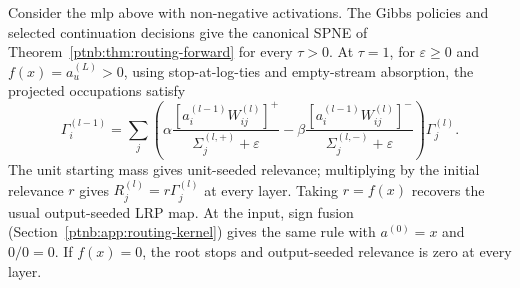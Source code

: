 \begin{theoremenv}\label{ptnb:thm:ab-recovery}\label{ptnb:thm:lrp-recovery}\label{thm:lrp_recovery}
Consider the \ac{mlp} above with non-negative activations. The Gibbs policies and selected continuation decisions give the canonical SPNE of Theorem~\ref{ptnb:thm:routing-forward} for every $\tau>0$. At $\tau=1$, for $\varepsilon\geq0$ and $f(x)=a_u^{(L)}>0$, using stop-at-log-ties and empty-stream absorption, the projected occupations satisfy
 \begin{equation}\label{ptnb:eq:lrp-eps-recovery}
 \Gamma_i^{(l-1)}=\sum_j\left(
 \alpha\frac{[a_i^{(l-1)}W_{ij}^{(l)}]^+}{\Sigma_j^{(l,+)}+\varepsilon}
 -\beta\frac{[a_i^{(l-1)}W_{ij}^{(l)}]^-}{\Sigma_j^{(l,-)}+\varepsilon}
 \right)\Gamma_j^{(l)}.
 \end{equation}
 The unit starting mass gives unit-seeded relevance; multiplying by the initial relevance $r$ gives $R_j^{(l)}=r\Gamma_j^{(l)}$ at every layer. Taking $r=f(x)$ recovers the usual output-seeded LRP map. At the input, sign fusion (Section~\ref{ptnb:app:routing-kernel}) gives the same rule with $a^{(0)}=x$ and $0/0=0$. If $f(x)=0$, the root stops and output-seeded relevance is zero at every layer.
\end{theoremenv}
